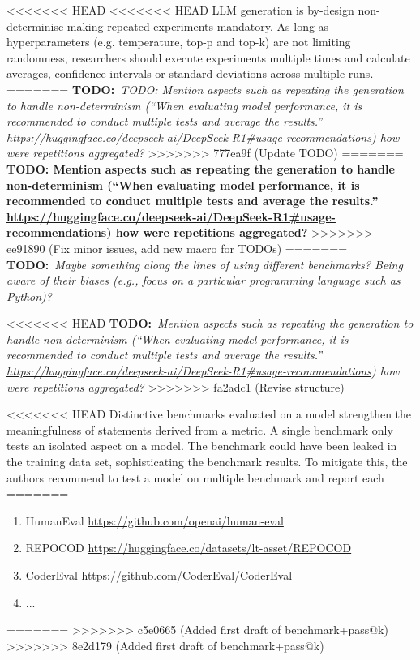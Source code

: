 \documentclass[11pt]{article}
\newcommand{\todo}[1]{{\textbf{TODO:}\ \textit{#1}}} %
\begin{document}
<<<<<<< HEAD
<<<<<<< HEAD
LLM generation is by-design non-determinisc making repeated experiments mandatory. %
As long as hyperparameters (e.g. temperature, top-p and top-k) are not limiting randomness, researchers should execute experiments multiple times and calculate averages, confidence intervals or standard deviations across multiple runs.
=======
\todo{TODO: Mention aspects such as repeating the generation to handle non-determinism (``When evaluating model performance, it is recommended to conduct multiple tests and average the results.'' https://huggingface.co/deepseek-ai/DeepSeek-R1#usage-recommendations) how were repetitions aggregated?}
>>>>>>> 777ea9f (Update TODO)
=======
\textbf{TODO: Mention aspects such as repeating the generation to handle non-determinism (``When evaluating model performance, it is recommended to conduct multiple tests and average the results.''  \url{https://huggingface.co/deepseek-ai/DeepSeek-R1\#usage-recommendations}) how were repetitions aggregated?}
>>>>>>> ee91890 (Fix minor issues, add new macro for TODOs)
=======
\todo{Maybe something along the lines of using different benchmarks? Being aware of their biases (e.g., focus on a particular programming language such as Python)?}

<<<<<<< HEAD
\todo{Mention aspects such as repeating the generation to handle non-determinism (``When evaluating model performance, it is recommended to conduct multiple tests and average the results.''  \url{https://huggingface.co/deepseek-ai/DeepSeek-R1\#usage-recommendations}) how were repetitions aggregated?}
>>>>>>> fa2adc1 (Revise structure)

<<<<<<< HEAD
Distinctive benchmarks evaluated on a model strengthen the meaningfulness of statements derived from a metric.
A single benchmark only tests an isolated aspect on a model.
The benchmark could have been leaked in the training data set, sophisticating the benchmark results.
To mitigate this, the authors recommend to test a model on multiple benchmark and report each
=======
\begin{enumerate}
\item HumanEval \url{https://github.com/openai/human-eval}
\item REPOCOD \url{https://huggingface.co/datasets/lt-asset/REPOCOD}
\item CoderEval \url{https://github.com/CoderEval/CoderEval}
\item ...
\end{enumerate}
=======
>>>>>>> c5e0665 (Added first draft of benchmark+pass@k)
>>>>>>> 8e2d179 (Added first draft of benchmark+pass@k)
\end{document}
